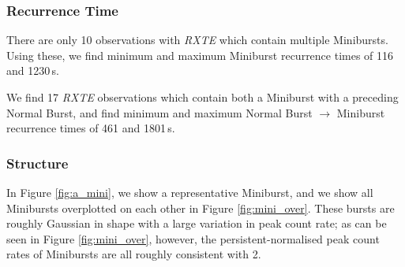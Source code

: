 \subsubsection{Recurrence Time}

\par There are only 10 observations with \textit{RXTE} which contain multiple Minibursts.  Using these, we find minimum and maximum Miniburst recurrence times of 116 and 1230\,s.
\par We find 17 \textit{RXTE} observations which contain both a Miniburst with a preceding Normal Burst, and find minimum and maximum Normal Burst $\rightarrow$ Miniburst recurrence times of 461 and 1801\,s.

\subsubsection{Structure}

\par In Figure \ref{fig:a_mini}, we show a representative Miniburst, and we show all Minibursts overplotted on each other in Figure \ref{fig:mini_over}.  These bursts are roughly Gaussian in shape with a large variation in peak count rate; as can be seen in Figure \ref{fig:mini_over}, however, the persistent-normalised peak count rates of Minibursts are all roughly consistent with 2.

